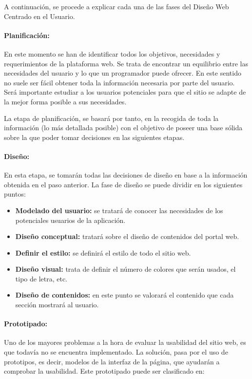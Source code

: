 A continuación, se procede a explicar cada una de las fases del Diseño Web Centrado en el
Usuario.

\paragraph{Planificación:} En este momento se han de identificar todos los objetivos, necesidades y requerimientos de la plataforma web. Se trata de encontrar un equilibrio entre las necesidades del usuario y lo que un programador puede ofrecer. En este sentido no suele ser fácil obtener toda la información necesaria por parte del usuario. Será importante estudiar a los usuarios potenciales para que el sitio se adapte de la mejor forma posible a sus necesidades.

La etapa de planificación, se basará por tanto, en la recogida de toda la información (lo más detallada posible) con el objetivo de poseer una base sólida sobre la que poder tomar decisiones en las siguientes etapas.

\paragraph{Diseño:} En esta etapa, se tomarán todas las decisiones de diseño en base a la información obtenida en el paso anterior. La fase de diseño se puede dividir en los siguientes puntos:

\begin{itemize}
	\item \textbf{Modelado del usuario:} se tratará de conocer las necesidades de los potenciales usuarios de
la aplicación.
	\item \textbf{Diseño conceptual:} tratará sobre el diseño de contenidos del portal web.
	\item \textbf{Definir el estilo:} se definirá el estilo de todo el sitio web.
	\item \textbf{Diseño visual:} trata de definir el número de colores que serán usados, el tipo de letra, etc.
	\item \textbf{Diseño de contenidos:} en este punto se valorará el contenido que cada sección mostrará al usuario.
\end{itemize}

\paragraph{Prototipado:} Uno de los mayores problemas a la hora de evaluar la usabilidad del sitio web, es que todavía no se encuentra  implementado. La solución, pasa por el uso de prototipos, es decir, modelos de la interfaz de la página, que ayudarán a comprobar la usabilidad. Este prototipado puede ser clasificado en:


